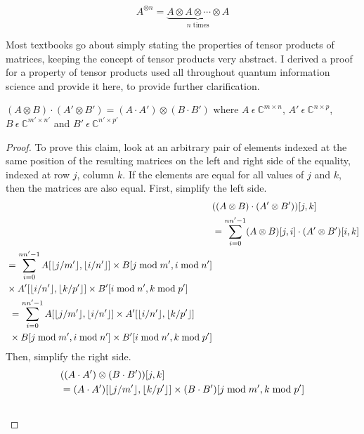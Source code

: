 $$A^{\otimes n} = \underbrace{A \otimes A \otimes \cdots \otimes A}_{n \text{ times}}$$

Most textbooks go about simply stating the properties of tensor products of matrices, keeping the concept of tensor products very abstract. I derived a proof for a property of tensor products used all throughout quantum information science and provide it here, to provide further clarification.
\begin{theorem}
\label{theorem:tensorProducts1}
$(A \otimes B) \cdot (A' \otimes B') = (A \cdot A')\otimes(B \cdot B')$ where $A \ \epsilon \ \mathbb{C}^{m \times n}$, $A' \ \epsilon \ \mathbb{C}^{n \times p}$, $B \ \epsilon \ \mathbb{C}^{m' \times n'}$ and $B' \ \epsilon \ \mathbb{C}^{n' \times p'}$
\end{theorem}
\begin{proof}
To prove this claim, look at an arbitrary pair of elements indexed at the same position of the resulting matrices on the left and right side of the equality, indexed at row $j$, column $k$. If the elements are equal for all values of $j$ and $k$, then the matrices are also equal. First, simplify the left side.
\begin{align}
& ((A \otimes B)\cdot(A' \otimes B'))[j,k] \\
&= \sum_{i=0}^{nn'-1} (A \otimes B)[j,i]\cdot(A' \otimes B')[i,k] \\
\begin{split}
&= \sum_{i=0}^{nn'-1} A[\lfloor j/m'\rfloor,\lfloor i/n'\rfloor] \times B[j \bmod m', i \bmod n'] \\ 
&\times A'[\lfloor i/n'\rfloor,\lfloor k/p'\rfloor] \times B'[i \bmod n', k \bmod p'] \\
\end{split}\\
\begin{split}
&= \sum_{i=0}^{nn'-1} A[\lfloor j/m'\rfloor,\lfloor i/n'\rfloor] \times A'[\lfloor i/n'\rfloor,\lfloor k/p'\rfloor] \\ 
&\times B[j \bmod m', i \bmod n'] \times B'[i \bmod n', k \bmod p'] \\
\end{split} \label{equation:tp1LeftSide}
\end{align}
Then, simplify the right side.
\begin{align}
& ((A \cdot A')\otimes(B \cdot B'))[j,k] \\
&= (A \cdot A')[\floor{j / m'},\floor{k / p'}] \times(B \cdot B')[j \bmod m',k \bmod p'] \\
\begin{split}

\end{split}
\end{align}
\end{proof}
